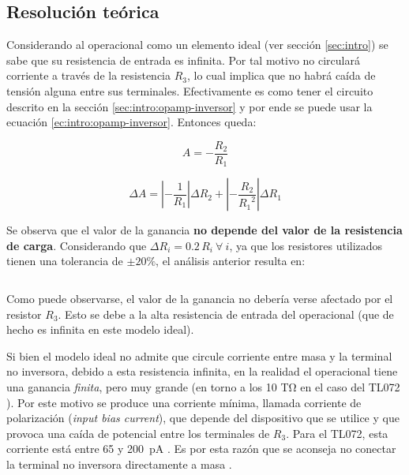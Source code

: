 \subsection{Resolución teórica}
\label{sec:1-teoria}

Considerando al operacional como un elemento ideal (ver sección \ref{sec:intro})
se sabe que su resistencia de entrada es infinita. Por tal motivo no circulará
corriente a través de la resistencia $R_3$, lo cual implica que no habrá caída
de tensión alguna entre sus terminales. Efectivamente es como tener el circuito
descrito en la sección \ref{sec:intro:opamp-inversor} y por ende se puede usar
la ecuación \ref{ec:intro:opamp-inversor}. Entonces queda:

\begin{equation}
    \label{ec:1-teoria:ganancia}
    A = -\frac{R_2}{R_1}
\end{equation}

\begin{equation}
    \label{ec:1-teoria:err-ganancia}
    \Delta A = \left| - \frac{1}{R_1} \right| \Delta R_2
             + \left| - \frac{R_2}{{R_1}^2} \right| \Delta R_1
\end{equation}

Se observa que el valor de la ganancia \textbf{no depende del valor de la
resistencia de carga}. Considerando que $\Delta R_i = 0.2\,R_i\ \forall\ i$, ya
que los resistores utilizados tienen una tolerancia de $\pm 20\%$, el análisis
anterior resulta en:

\[
    
\]

Como puede observarse, el valor de la ganancia no debería verse afectado por el
resistor $R_3$. Esto se debe a la alta resistencia de entrada del operacional
(que de hecho es infinita en este modelo ideal).

Si bien el modelo ideal no admite que circule corriente entre masa y la
terminal no inversora, debido a esta resistencia infinita, en la realidad
el operacional tiene una ganancia \textit{finita}, pero muy grande (en torno a
los 10 \si{\tera\ohm} en el caso del TL072 \cite[pág. 5]{datasheet-tl072}).
Por este motivo se produce una corriente mínima, llamada corriente de
polarización (\textit{input bias current}), que depende del dispositivo que se
utilice y que provoca una caída de potencial entre los terminales de $R_3$.
Para el TL072, esta corriente está entre 65 y \SI{200}{\pico\ampere} 
\cite[pág. 5]{datasheet-tl072}. Es por esta razón que se aconseja no
conectar la terminal no inversora directamente a masa \cite[pág. 252]{AOE}.
